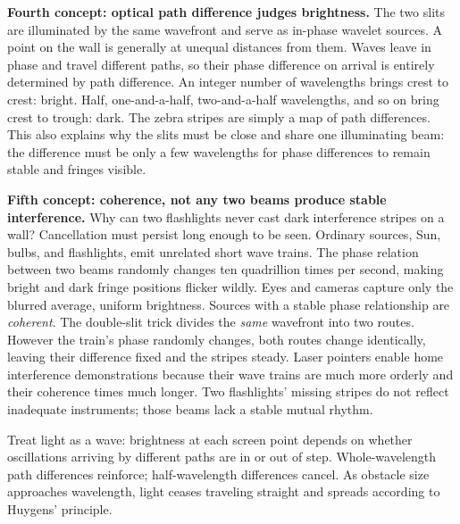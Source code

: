 \begin{mainline}
\textbf{Fourth concept: optical path difference judges brightness.} The two slits are illuminated by the same wavefront and serve as in-phase wavelet sources. A point on the wall is generally at unequal distances from them. Waves leave in phase and travel different paths, so their phase difference on arrival is entirely determined by path difference. An integer number of wavelengths brings crest to crest: bright. Half, one-and-a-half, two-and-a-half wavelengths, and so on bring crest to trough: dark. The zebra stripes are simply a map of path differences. This also explains why the slits must be close and share one illuminating beam: the difference must be only a few wavelengths for phase differences to remain stable and fringes visible.

\textbf{Fifth concept: coherence, not any two beams produce stable interference.} Why can two flashlights never cast dark interference stripes on a wall? Cancellation must persist long enough to be seen. Ordinary sources, Sun, bulbs, and flashlights, emit unrelated short wave trains. The phase relation between two beams randomly changes ten quadrillion times per second, making bright and dark fringe positions flicker wildly. Eyes and cameras capture only the blurred average, uniform brightness. Sources with a stable phase relationship are \emph{coherent}. The double-slit trick divides the \emph{same} wavefront into two routes. However the train's phase randomly changes, both routes change identically, leaving their difference fixed and the stripes steady. Laser pointers enable home interference demonstrations because their wave trains are much more orderly and their coherence times much longer. Two flashlights' missing stripes do not reflect inadequate instruments; those beams lack a stable mutual rhythm.
\end{mainline}


\begin{oneline}
Treat light as a wave: brightness at each screen point depends on whether oscillations arriving by different paths are in or out of step. Whole-wavelength path differences reinforce; half-wavelength differences cancel. As obstacle size approaches wavelength, light ceases traveling straight and spreads according to Huygens' principle.
\end{oneline}


